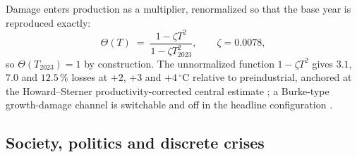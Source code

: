 \documentclass[12pt,a4paper]{article}
\newcommand{\degC}{$^{\circ}$C}
\begin{document}
Damage enters production as a multiplier, renormalized so that the base year is reproduced
exactly:
\begin{equation}
\Theta(T) \;=\; \frac{1-\zeta T^{2}}{1-\zeta T_{2023}^{2}},\qquad \zeta = 0.0078,
\label{eq:damage}
\end{equation}
so $\Theta(T_{2023})=1$ by construction. The unnormalized function $1-\zeta T^2$ gives
$3.1$, $7.0$ and $12.5\,\%$ losses at $+2$, $+3$ and $+4$\,\degC{} relative to preindustrial,
anchored at the Howard--Sterner productivity-corrected central estimate
\citep{howard2017,nordhaus2017}; a Burke-type growth-damage channel is switchable and off in
the headline configuration \citep{burke2015,burke2023}.

\subsection{Society, politics and discrete crises}
\end{document}
